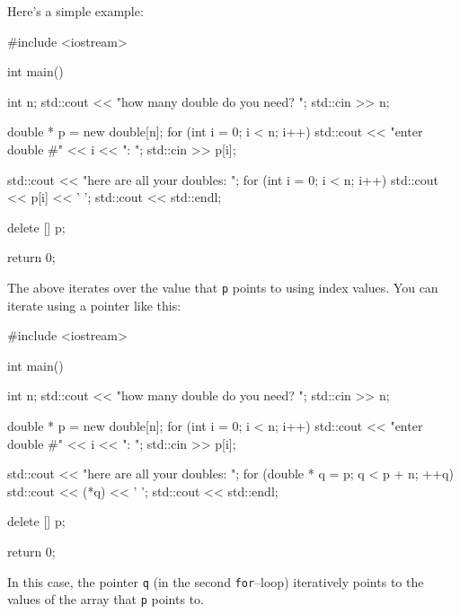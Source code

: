 Here's a simple example:
\begin{console}[frame=single,fontsize=\footnotesize]
#include <iostream>

int main()
{
    int n;
    std::cout << "how many double do you need? ";
    std::cin >> n;

    double * p = new double[n];
    for (int i = 0; i < n; i++)
    {
        std::cout << "enter double #" << i << ": ";
        std::cin >> p[i];
    }

    std::cout << "here are all your doubles: ";
    for (int i = 0; i < n; i++)
    {
        std::cout << p[i] << ' ';
    }
    std::cout << std::endl;

    delete [] p;

    return 0;
}
\end{console}
The above iterates over the value that \verb!p! points
to using index values.
You can iterate using a pointer like this:
\begin{console}[frame=single,fontsize=\footnotesize]
#include <iostream>

int main()
{
    int n;
    std::cout << "how many double do you need? ";
    std::cin >> n;

    double * p = new double[n];
    for (int i = 0; i < n; i++)
    {
        std::cout << "enter double #" << i << ": ";
        std::cin >> p[i];
    }

    std::cout << "here are all your doubles: ";
    for (double * q = p; q < p + n; ++q)
    {
        std::cout << (*q) << ' ';
    }
    std::cout << std::endl;

    delete [] p;

    return 0;
}
\end{console}
In this case, the pointer \verb!q! (in the second \verb!for!--loop)
iteratively points to the values
of the array that \verb!p! points to.

